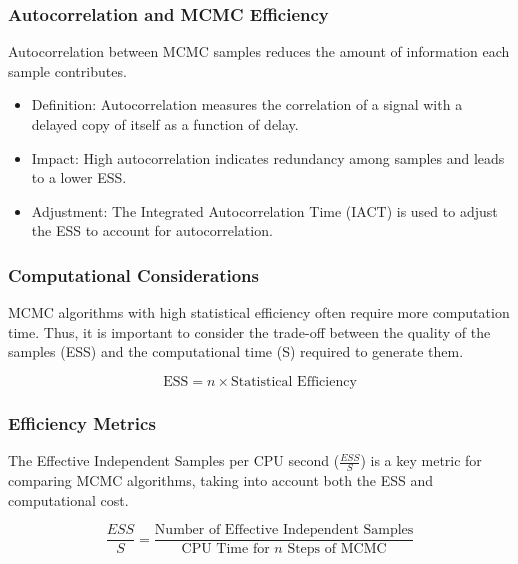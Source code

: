 \documentclass{article}
\begin{document}
\subsubsection{Autocorrelation and MCMC Efficiency}
Autocorrelation between MCMC samples reduces the amount of information each sample contributes. 

\begin{itemize}
    \item Definition: Autocorrelation measures the correlation of a signal with a delayed copy of itself as a function of delay.
    \item Impact: High autocorrelation indicates redundancy among samples and leads to a lower ESS.
    \item Adjustment: The Integrated Autocorrelation Time (IACT) is used to adjust the ESS to account for autocorrelation.
\end{itemize}

\subsubsection{Computational Considerations}
MCMC algorithms with high statistical efficiency often require more computation time. Thus, it is important to consider the trade-off between the quality of the samples (ESS) and the computational time (S) required to generate them.

\begin{equation}
    \text{ESS} = n \times \text{Statistical Efficiency}
\end{equation}

\subsubsection{Efficiency Metrics}
The Effective Independent Samples per CPU second (\( \frac{ESS}{S} \)) is a key metric for comparing MCMC algorithms, taking into account both the ESS and computational cost.

\begin{equation}
    \frac{ESS}{S} = \frac{\text{Number of Effective Independent Samples}}{\text{CPU Time for } n \text{ Steps of MCMC}}
\end{equation}
\end{document}
